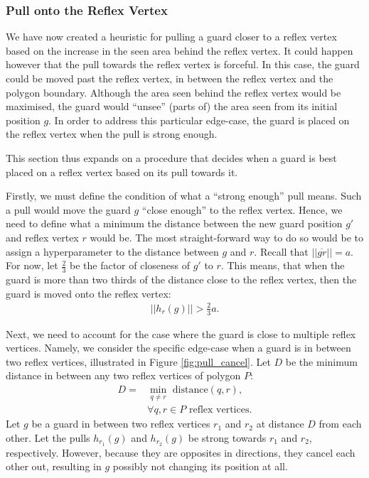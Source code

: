 \subsubsection{Pull onto the Reflex Vertex}
\label{sec:pull_onto}
We have now created a heuristic for pulling a guard closer to a reflex vertex based on the increase in the seen area behind the reflex vertex. It could happen however that the pull towards the reflex vertex is forceful. In this case, the guard could be moved past the reflex vertex, in between the reflex vertex and the polygon boundary. Although the area seen behind the reflex vertex would be maximised, the guard would ``unsee'' (parts of) the area seen from its initial position $g$. In order to address this particular edge-case, the guard is placed on the reflex vertex when the pull is strong enough. 

This section thus expands on a procedure that decides when a guard is best placed on a reflex vertex based on its pull towards it.

Firstly, we must define the condition of what a ``strong enough'' pull means. Such a pull would move the guard $g$ ``close enough'' to the reflex vertex. Hence, we need to define what a minimum the distance between the new guard position $g'$ and reflex vertex $r$ would be. The most straight-forward way to do so would be to assign a hyperparameter to the distance between $g$ and $r$. Recall that $||\overline{gr}|| = a$. For now, let $\frac 2 3$ be the factor of closeness of $g'$ to $r$. This means, that when the guard is more than two thirds of the distance close to the reflex vertex, then the guard is moved onto the reflex vertex: 
\begin{align}
    ||h_r(g)|| > \frac 2 3 a. \label{eq:h_a}
\end{align}

Next, we need to account for the case where the guard is close to multiple reflex vertices. Namely, we consider the specific edge-case when a guard is in between two reflex vertices, illustrated in Figure \ref{fig:pull_cancel}. Let $D$ be the minimum distance in between any two reflex vertices of polygon $P$:
\begin{align*}
    D = &\min_{q \neq r} \text{ distance}(q, r), \\
    &\forall q, r \in P \text{ reflex vertices}.
\end{align*}
Let $g$ be a guard in between two reflex vertices $r_1$ and $r_2$ at distance $D$ from each other. Let the pulls $h_{r_1}(g)$ and $h_{r_2}(g)$ be strong towards $r_1$ and $r_2$, respectively. However, because they are opposites in directions, they cancel each other out, resulting in $g$ possibly not changing its position at all.

